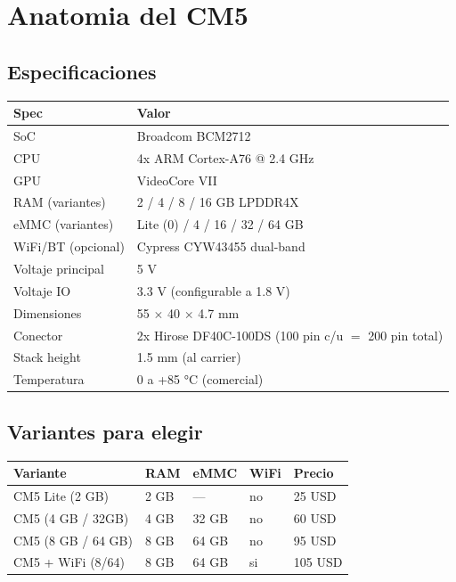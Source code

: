 \documentclass[11pt,a4paper,oneside,openright]{book}
\begin{document}
\chapter{Anatomia del CM5}

\section{Especificaciones}

\begin{center}
\begin{tabular}{ll}
\toprule
\textbf{Spec} & \textbf{Valor} \\
\midrule
SoC                 & Broadcom BCM2712 \\
CPU                 & 4x ARM Cortex-A76 @ 2.4 GHz \\
GPU                 & VideoCore VII \\
RAM (variantes)     & 2 / 4 / 8 / 16 GB LPDDR4X \\
eMMC (variantes)    & Lite (0) / 4 / 16 / 32 / 64 GB \\
WiFi/BT (opcional)  & Cypress CYW43455 dual-band \\
Voltaje principal   & 5 V \\
Voltaje IO          & 3.3 V (configurable a 1.8 V) \\
Dimensiones         & 55 $\times$ 40 $\times$ 4.7 mm \\
Conector            & 2x Hirose DF40C-100DS (100 pin c/u $=$ 200 pin total) \\
Stack height        & 1.5 mm (al carrier) \\
Temperatura         & 0 a +85 °C (comercial) \\
\bottomrule
\end{tabular}
\end{center}

\section{Variantes para elegir}

\begin{center}
\begin{tabular}{lllll}
\toprule
\textbf{Variante} & \textbf{RAM} & \textbf{eMMC} & \textbf{WiFi} & \textbf{Precio} \\
\midrule
CM5 Lite (2 GB)    & 2 GB & --- & no & 25 USD \\
CM5 (4 GB / 32GB)  & 4 GB & 32 GB & no & 60 USD \\
CM5 (8 GB / 64 GB) & 8 GB & 64 GB & no & 95 USD \\
CM5 + WiFi (8/64)  & 8 GB & 64 GB & si & 105 USD \\
\bottomrule
\end{tabular}
\end{center}
\end{document}
